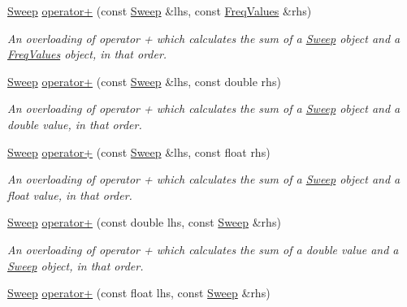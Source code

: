 \begin{DoxyCompactItemize}
\hyperlink{structSweep}{Sweep} \hyperlink{structSweep_a5d6fad874c778ae77a10b57446a0bd93}{operator+} (const \hyperlink{structSweep}{Sweep} \&lhs, const \hyperlink{structFreqValues}{Freq\+Values} \&rhs)
\begin{DoxyCompactList}\small\item\em An overloading of operator + which calculates the sum of a {\itshape \hyperlink{structSweep}{Sweep}} object and a {\itshape \hyperlink{structFreqValues}{Freq\+Values}} object, in that order. \end{DoxyCompactList}\item 
\hyperlink{structSweep}{Sweep} \hyperlink{structSweep_aec740fb521dac7c61740cce4d8df333d}{operator+} (const \hyperlink{structSweep}{Sweep} \&lhs, const double rhs)
\begin{DoxyCompactList}\small\item\em An overloading of operator + which calculates the sum of a {\itshape \hyperlink{structSweep}{Sweep}} object and a {\itshape double} value, in that order. \end{DoxyCompactList}\item 
\mbox{\label{structSweep_ae8dce428f848644d0a68cc8309f88ebf}} 
\hyperlink{structSweep}{Sweep} \hyperlink{structSweep_ae8dce428f848644d0a68cc8309f88ebf}{operator+} (const \hyperlink{structSweep}{Sweep} \&lhs, const float rhs)
\begin{DoxyCompactList}\small\item\em An overloading of operator + which calculates the sum of a {\itshape \hyperlink{structSweep}{Sweep}} object and a {\itshape float} value, in that order. \end{DoxyCompactList}\item 
\hyperlink{structSweep}{Sweep} \hyperlink{structSweep_abd8f8ae801948d1ed0b12de92659320b}{operator+} (const double lhs, const \hyperlink{structSweep}{Sweep} \&rhs)
\begin{DoxyCompactList}\small\item\em An overloading of operator + which calculates the sum of a {\itshape double} value and a {\itshape \hyperlink{structSweep}{Sweep}} object, in that order. \end{DoxyCompactList}\item 
\mbox{\label{structSweep_ac0d73d5e8e3aab8f87c9815588b66821}} 
\hyperlink{structSweep}{Sweep} \hyperlink{structSweep_ac0d73d5e8e3aab8f87c9815588b66821}{operator+} (const float lhs, const \hyperlink{structSweep}{Sweep} \&rhs)

\end{DoxyCompactItemize}
